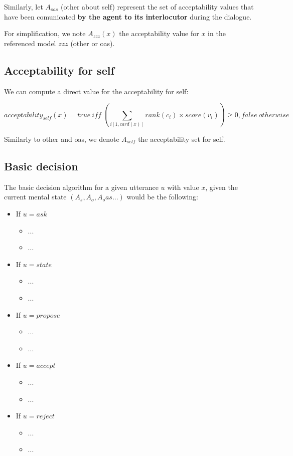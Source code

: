 \documentclass{llncs}
\begin{document}
Similarly, let $A_{oas}$ (other about self) represent the set of acceptability values that have been comunicated \textbf{by the agent to its interlocutor} during the dialogue.

For simplification, we note $A_{zzz}(x)$ the acceptability value for $x$ in the referenced model $zzz$ (other or oas).

\subsection{Acceptability for self}

We can compute a direct value for the acceptability for self:

$$acceptability_{self}(x) = true\ iff\ \left(\sum_{i[1,card(x)]} rank(c_i)\times score(v_i)\right)\geq0, false\ otherwise$$

Similarly to other and oas, we denote $A_{self}$ the acceptability set for self.

\subsection{Basic decision}

The basic decision algorithm for a given utterance $u$ with value $x$, given the current mental state $(A_s,A_o,A_oas...)$ would be the following:

\begin{itemize}
	\item If $u=ask$
	\begin{itemize}
		\item ...
		\item ...
	\end{itemize}
	\item If $u=state$
	\begin{itemize}
		\item ...
		\item ...
	\end{itemize}
	\item If $u=propose$
	\begin{itemize}
		\item ...
		\item ...
	\end{itemize}
	\item If $u=accept$
	\begin{itemize}
		\item ...
		\item ...
	\end{itemize}
	\item If $u=reject$
	\begin{itemize}
		\item ...
		\item ...
	\end{itemize}
\end{itemize}
\end{document}

